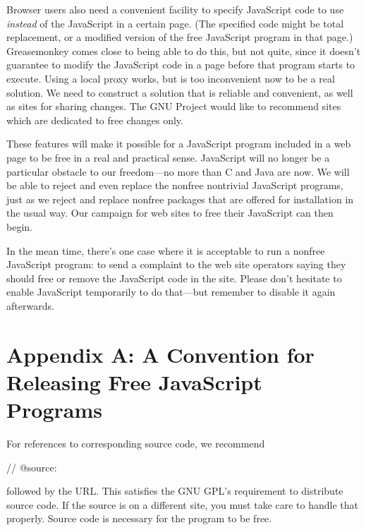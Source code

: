 Browser users also need a convenient facility to specify JavaScript
code to use \emph{instead} of the JavaScript in a certain page.  (The
specified code might be total replacement, or a modified version of
the free JavaScript program in that page.)  
Greasemonkey comes close to being able to do this, but not quite,
since it doesn't guarantee to modify the JavaScript code in a page
before that program starts to execute.  Using a local proxy works, but
is too inconvenient now to be a real solution.  We need to construct a
solution that is reliable and convenient, as well as sites for sharing
changes.  The GNU Project would like to recommend sites which are
dedicated to free changes only.

These features will make it possible for a JavaScript program included
in a web page to be free in a real and practical sense.  JavaScript
will no longer be a particular obstacle to our freedom---no more than
C and 
Java are now.  We will be able to reject and even replace the
nonfree nontrivial JavaScript programs, just as we reject and replace
nonfree packages that are offered for installation in the usual way.
Our campaign for web sites to free their JavaScript can then begin.

In the mean time, there's one case where it is acceptable to run a
nonfree JavaScript program: to send a complaint to the web site
operators saying they should free or remove the JavaScript code in the
site.  Please don't hesitate to enable JavaScript temporarily to do
that---but remember to disable it again afterwards.

\section*{Appendix A: A Convention for Releasing Free JavaScript Programs}

For references to corresponding source code, we recommend

\begin{quot}
    // @source:
\end{quot}

\noindent 
followed by the URL.  This satisfies the GNU GPL's requirement to
distribute source code.  If the source is on a different site, you
must take care to handle that properly.  Source code is necessary for
the program to be free.

